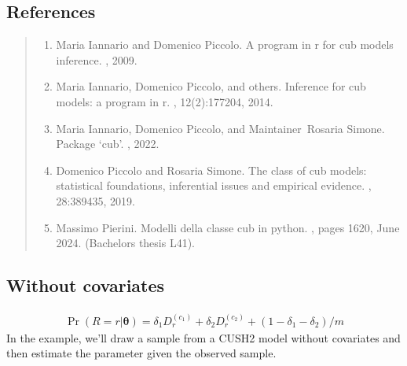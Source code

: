 \documentclass[letterpaper,10pt,english]{sphinxmanual}
\begin{document}
\subsection{References}
\label{\detokenize{manual:id118}}\begin{quote}
\begin{enumerate}
%
\setcounter{enumi}{0}
\item {} 
\sphinxAtStartPar
Maria Iannario and Domenico Piccolo. A program in r for cub models inference. , 2009.

\item {} 
\sphinxAtStartPar
Maria Iannario, Domenico Piccolo, and others. Inference for cub models: a program in r. , 12(2):177\textendash{}204, 2014.

\item {} 
\sphinxAtStartPar
Maria Iannario, Domenico Piccolo, and Maintainer Rosaria Simone. Package ‘cub’. , 2022.

\item {} 
\sphinxAtStartPar
Domenico Piccolo and Rosaria Simone. The class of cub models: statistical foundations, inferential issues and empirical evidence. , 28:389\textendash{}435, 2019.

\item {} 
\sphinxAtStartPar
Massimo Pierini. Modelli della classe cub in python. , pages 16\textendash{}20, June 2024. (Bachelor\textquotesingle{}s thesis L\sphinxhyphen{}41).

\end{enumerate}
\end{quote}


\subsection{Without covariates}
\label{\detokenize{manual:cush2-without-covariates}}\label{\detokenize{manual:id156}}
\sphinxAtStartPar
{}
\begin{equation*}
\begin{split}\Pr(R=r|\pmb\theta) = \delta_1 D_r^{(c_1)} + \delta_2 D_r^{(c_2)} + (1-\delta_1-\delta_2)/m\end{split}
\end{equation*}
\sphinxAtStartPar
In the example, we’ll draw a sample from a CUSH2 model without covariates and
then estimate the parameter given the observed sample.
\end{document}
